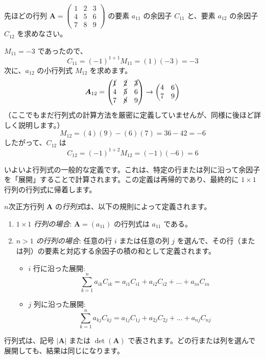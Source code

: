 \begin{ex}
先ほどの行列 $\bm{A} = \begin{pmatrix} 1 & 2 & 3 \\ 4 & 5 & 6 \\ 7 & 8 & 9 \end{pmatrix}$ の要素 $a_{11}$ の余因子 $C_{11}$ と、要素 $a_{12}$ の余因子 $C_{12}$ を求めなさい。

$M_{11} = -3$ であったので、
\[ C_{11} = (-1)^{1+1}M_{11} = (1)(-3) = -3 \]
次に、$a_{12}$ の小行列式 $M_{12}$ を求めます。
\[ \bm{A}_{12} = \begin{pmatrix} \cancel{1} & \cancel{2} & \cancel{3} \\ 4 & \cancel{5} & 6 \\ 7 & \cancel{8} & 9 \end{pmatrix} \rightarrow \begin{pmatrix} 4 & 6 \\ 7 & 9 \end{pmatrix} \]
（ここでもまだ行列式の計算方法を厳密に定義していませんが、同様に後ほど詳しく説明します。）
\[ M_{12} = (4)(9) - (6)(7) = 36 - 42 = -6 \]
したがって、$C_{12}$ は
\[ C_{12} = (-1)^{1+2}M_{12} = (-1)(-6) = 6 \]
\end{ex}

いよいよ行列式の一般的な定義です。これは、特定の行または列に沿って余因子を「展開」することで計算されます。この定義は再帰的であり、最終的に $1 \times 1$ 行列の行列式に帰着します。

\begin{dfn}
$n$次正方行列 $\bm{A}$ の\emph{行列式}は、以下の規則によって定義されます。
\begin{enumerate}
    \item \emph{$1 \times 1$ 行列の場合}: $\bm{A} = (a_{11})$ の行列式は $a_{11}$ である。
    \item \emph{$n > 1$ の行列の場合}: 任意の行 $i$ または任意の列 $j$ を選んで、その行（または列）の要素と対応する余因子の積の和として定義されます。
    \begin{itemize}
        \item $i$ 行に沿った展開:
        \[ \sum_{k=1}^{n} a_{ik}C_{ik} = a_{i1}C_{i1} + a_{i2}C_{i2} + \dots + a_{in}C_{in} \]
        \item $j$ 列に沿った展開:
        \[ \sum_{k=1}^{n} a_{kj}C_{kj} = a_{1j}C_{1j} + a_{2j}C_{2j} + \dots + a_{nj}C_{nj} \]
    \end{itemize}
\end{enumerate}
行列式は、記号 $|\bm{A}|$ または $\det(\bm{A})$ で表されます。どの行または列を選んで展開しても、結果は同じになります。
\end{dfn}

